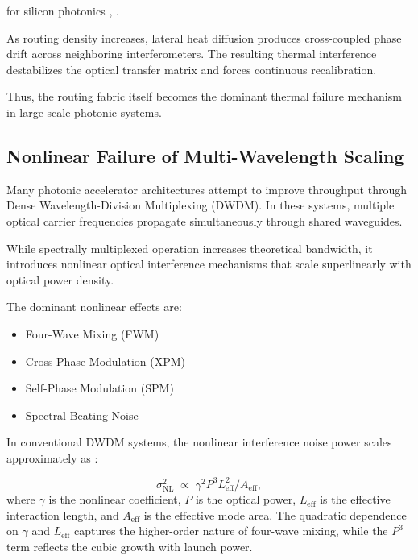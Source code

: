 \documentclass[journal]{IEEEtran}
\begin{document}
for silicon photonics \cite{Saleh2019}, \cite{Incropera2006}.

As routing density increases, lateral heat diffusion produces cross-coupled phase drift across neighboring interferometers. The resulting thermal interference destabilizes the optical transfer matrix and forces continuous recalibration.

Thus, the routing fabric itself becomes the dominant thermal failure mechanism in large-scale photonic systems.

\subsection{\textbf{Nonlinear Failure of Multi-Wavelength Scaling}}
\label{sec:nonlinear_failure}

Many photonic accelerator architectures attempt to improve throughput through Dense Wavelength-Division Multiplexing (DWDM). In these systems, multiple optical carrier frequencies propagate simultaneously through shared waveguides.

While spectrally multiplexed operation increases theoretical bandwidth, it introduces nonlinear optical interference mechanisms that scale superlinearly with optical power density.

The dominant nonlinear effects are:

\begin{itemize}
\item Four-Wave Mixing (FWM)
\item Cross-Phase Modulation (XPM)
\item Self-Phase Modulation (SPM)
\item Spectral Beating Noise
\end{itemize}

In conventional DWDM systems, the nonlinear interference noise power scales approximately as \cite{Boyd2020,Cotter1999}:

\begin{equation}
\sigma_{\mathrm{NL}}^2 \;\propto\; \gamma^2 P^3 L_{\mathrm{eff}}^2 / A_{\mathrm{eff}},
\label{eq:fwm_scaling}
\end{equation}
where $\gamma$ is the nonlinear coefficient, $P$ is the optical power, $L_{\mathrm{eff}}$ is the effective interaction length, and $A_{\mathrm{eff}}$ is the effective mode area. The quadratic dependence on $\gamma$ and $L_{\mathrm{eff}}$ captures the higher-order nature of four-wave mixing, while the $P^3$ term reflects the cubic growth with launch power.
\end{document}
